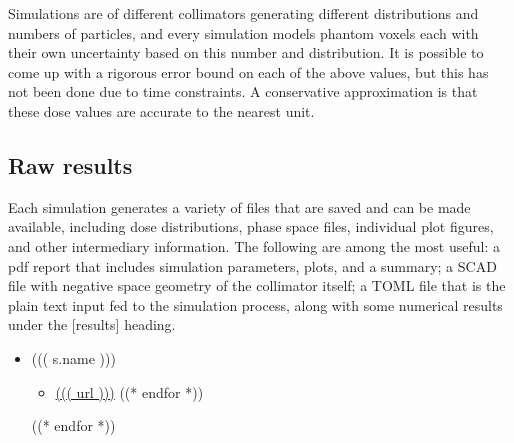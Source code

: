 \documentclass[12pt]{article}
\begin{document}
Simulations are of different collimators generating different distributions and numbers of particles, and every simulation models phantom voxels each with their own uncertainty based on this number and distribution. It is possible to come up with a rigorous error bound on each of the above values, but this has not been done due to time constraints. A conservative approximation is that these dose values are accurate to the nearest unit.

\subsection*{Raw results}
Each simulation generates a variety of files that are saved and can be made available, including dose distributions, phase space files, individual plot figures, and other intermediary information. The following are among the most useful: a pdf report that includes simulation parameters, plots, and a summary; a SCAD file with negative space geometry of the collimator itself; a TOML file that is the plain text input fed to the simulation process, along with some numerical results under the [results] heading.

\begin{itemize}
((* for s in simulations *))
	\item ((( s.name )))
\begin{itemize}
	((* for url in s.urls *))
	\item \url{((( url )))}
	((* endfor *))
\end{itemize}
((* endfor *))
\end{itemize}
\end{document}
